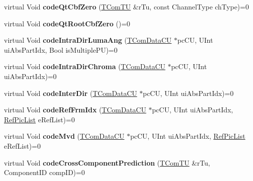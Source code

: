 \begin{DoxyCompactItemize}
virtual Void {\bfseries code\+Qt\+Cbf\+Zero} (\hyperlink{class_t_com_t_u}{T\+Com\+TU} \&r\+Tu, const Channel\+Type ch\+Type)=0
\item 
\mbox{\label{class_t_enc_entropy_if_ad58b36c6d812985f7c65789979cb4851}} 
virtual Void {\bfseries code\+Qt\+Root\+Cbf\+Zero} ()=0
\item 
\mbox{\label{class_t_enc_entropy_if_a6d4e867f47ed66b59b6a94a79774294b}} 
virtual Void {\bfseries code\+Intra\+Dir\+Luma\+Ang} (\hyperlink{class_t_com_data_c_u}{T\+Com\+Data\+CU} $\ast$pc\+CU, U\+Int ui\+Abs\+Part\+Idx, Bool is\+Multiple\+PU)=0
\item 
\mbox{\label{class_t_enc_entropy_if_ad26b1fce1402531080b45697ef879831}} 
virtual Void {\bfseries code\+Intra\+Dir\+Chroma} (\hyperlink{class_t_com_data_c_u}{T\+Com\+Data\+CU} $\ast$pc\+CU, U\+Int ui\+Abs\+Part\+Idx)=0
\item 
\mbox{\label{class_t_enc_entropy_if_a41dd41854200a782e57a01a3bd34864b}} 
virtual Void {\bfseries code\+Inter\+Dir} (\hyperlink{class_t_com_data_c_u}{T\+Com\+Data\+CU} $\ast$pc\+CU, U\+Int ui\+Abs\+Part\+Idx)=0
\item 
\mbox{\label{class_t_enc_entropy_if_af61e7e3e8e6265fe1e079e30d870a9ee}} 
virtual Void {\bfseries code\+Ref\+Frm\+Idx} (\hyperlink{class_t_com_data_c_u}{T\+Com\+Data\+CU} $\ast$pc\+CU, U\+Int ui\+Abs\+Part\+Idx, \hyperlink{_type_def_8h_a93cea48eb9dcfd661168dee82e41b384}{Ref\+Pic\+List} e\+Ref\+List)=0
\item 
\mbox{\label{class_t_enc_entropy_if_ae14b91d7939ecef8e2a75a9bcf0987e4}} 
virtual Void {\bfseries code\+Mvd} (\hyperlink{class_t_com_data_c_u}{T\+Com\+Data\+CU} $\ast$pc\+CU, U\+Int ui\+Abs\+Part\+Idx, \hyperlink{_type_def_8h_a93cea48eb9dcfd661168dee82e41b384}{Ref\+Pic\+List} e\+Ref\+List)=0
\item 
\mbox{\label{class_t_enc_entropy_if_a706327c638b4b89dc15bc22452775ffe}} 
virtual Void {\bfseries code\+Cross\+Component\+Prediction} (\hyperlink{class_t_com_t_u}{T\+Com\+TU} \&r\+Tu, Component\+ID comp\+ID)=0
\item 
\mbox{\label{class_t_enc_entropy_if_a4a2a2d42c3078b7c30f64550c60d29c8}} 

\end{DoxyCompactItemize}
